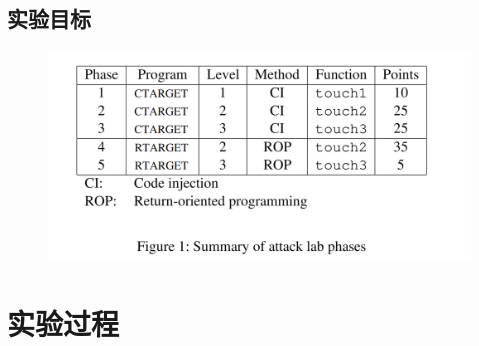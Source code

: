 \documentclass[12pt, a4paper, oneside]{ctexart}
\begin{document}
\subsection{实验目标}
\begin{figure}[htbp]
    \includegraphics[scale=0.4]{image/1.1-1.png}
\end{figure}
\section{实验过程}
\end{document}
